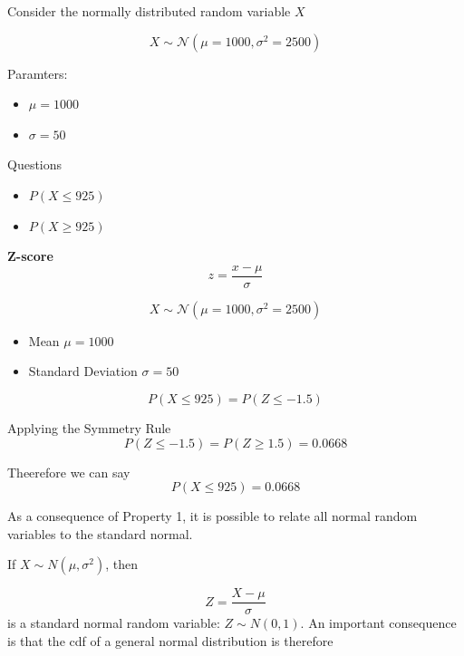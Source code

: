 \documentclass[12pt]{report}
\begin{document}
{{%

\Large

Consider the normally distributed random variable $X$

\[ X \sim \mathcal{N}(\mu=1000,\sigma^2 = 2500) \]

Paramters:
\begin{itemize}
	\item $\mu =1000$
	\item $\sigma =50$
\end{itemize}
Questions

\begin{itemize}
	\item $P(X \leq 925)$
	\item $P(X \geq 925)$
\end{itemize}




\textbf{Z-score}
\[ z =\frac{x - \mu}{\sigma}\]

\[ X \sim \mathcal{N}(\mu=1000,\sigma^2 = 2500) \]

\begin{itemize}
	\item Mean $\mu= 1000$
	\item Standard Deviation $\sigma = 50$
\end{itemize}



\[ P(X \leq 925)  = P(Z \leq -1.5) \]

Applying the Symmetry Rule
\[ P(Z \leq -1.5) = P(Z \geq 1.5) = 0.0668\]

Theerefore we can say 
\[ P(X \leq 925) = 0.0668 \]



As a consequence of Property 1, it is possible to relate all normal random variables to the standard normal.

If $X \sim N(\mu, \sigma^2)$, then

\[Z = \frac{X - \mu}{\sigma} \]
is a standard normal random variable: $Z \sim N(0,1)$. An important consequence is that the cdf of a general normal distribution is therefore

}}
\end{document}
